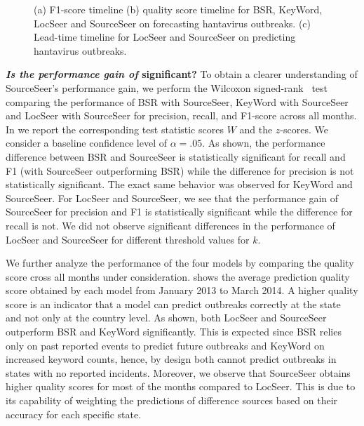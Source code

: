 \documentclass[twoside,leqno,twocolumn]{article}
\newcommand{\fullmodel}{{{\sf SourceSeer}}\xspace}
\newcommand{\locationmodel}{{\sf LocSeer}\xspace}
\newcommand{\keymodel}{{\sf KeyWord}\xspace}
\begin{document}
\begin{figure}[t]
\begin{center}
\end{center}
\caption{(a) F1-score timeline (b) quality score timeline for BSR, \keymodel, \locationmodel and \fullmodel on forecasting hantavirus outbreaks. (c) Lead-time timeline for \locationmodel and \fullmodel on predicting hantavirus outbreaks.}
\label{fig:perf_timelines}
\end{figure}


\noindent\textbf{{\em Is the performance gain of {}} significant?} To obtain a clearer understanding of \fullmodel's performance gain, we perform the Wilcoxon signed-rank~\cite{Wilcoxon45} test comparing the performance of  BSR with \fullmodel,  \keymodel with \fullmodel and \locationmodel with \fullmodel for precision, recall, and F1-score across all months. In  we report the corresponding test statistic scores $W$ and the $z$-scores. We consider a baseline confidence level of $\alpha = .05$. As shown, the performance difference between BSR and \fullmodel is statistically significant for recall and F1 (with \fullmodel outperforming BSR) while the difference for precision is not statistically significant. The exact same behavior was observed for \keymodel and \fullmodel. For \locationmodel and \fullmodel, we see that the performance gain of \fullmodel for precision and F1 is statistically significant while the difference for recall is not. We did not observe significant differences in the performance of \locationmodel and \fullmodel for different threshold values for $k$. 

We further analyze the performance of the four models by comparing the quality score cross all months under consideration.  shows the average prediction quality score obtained by each model from January 2013 to March 2014. A higher quality score is an indicator that a model can predict outbreaks correctly at the state and not only at the country level. As shown, both \locationmodel and \fullmodel outperform BSR and \keymodel significantly. This is expected since BSR relies only on past reported events to predict future outbreaks and \keymodel on increased keyword counts, hence, by design both cannot predict outbreaks in states with no reported incidents. Moreover, we observe that \fullmodel obtains higher quality scores for most of the months compared to \locationmodel. This is due to its capability of weighting the predictions of difference sources  based on their accuracy for each specific state.
\end{document}
